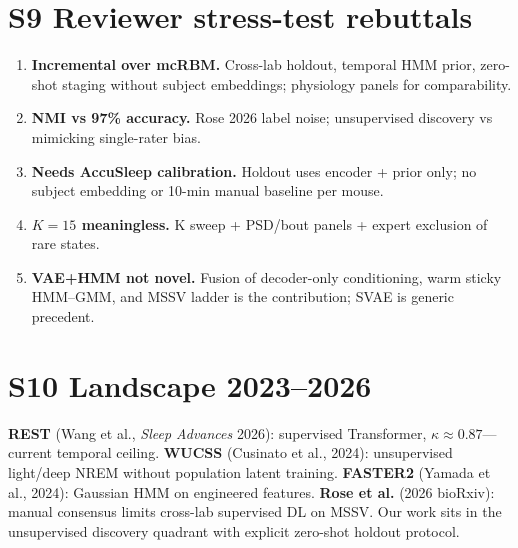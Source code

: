 \documentclass[10pt]{article}
\begin{document}
\section{S9 Reviewer stress-test rebuttals}
\begin{enumerate}
\item \textbf{Incremental over mcRBM.} Cross-lab holdout, temporal HMM prior, zero-shot staging without subject embeddings; physiology panels for comparability.
\item \textbf{NMI vs 97\% accuracy.} Rose 2026 label noise; unsupervised discovery vs mimicking single-rater bias.
\item \textbf{Needs AccuSleep calibration.} Holdout uses encoder + prior only; no subject embedding or 10-min manual baseline per mouse.
\item \textbf{$K{=}15$ meaningless.} K sweep + PSD/bout panels + expert exclusion of rare states.
\item \textbf{VAE+HMM not novel.} Fusion of decoder-only conditioning, warm sticky HMM--GMM, and MSSV ladder is the contribution; SVAE is generic precedent.
\end{enumerate}

\section{S10 Landscape 2023--2026}
\textbf{REST} (Wang et al., \emph{Sleep Advances} 2026): supervised Transformer, $\kappa\approx 0.87$---current temporal ceiling.
\textbf{WUCSS} (Cusinato et al., 2024): unsupervised light/deep NREM without population latent training.
\textbf{FASTER2} (Yamada et al., 2024): Gaussian HMM on engineered features.
\textbf{Rose et al.} (2026 bioRxiv): manual consensus limits cross-lab supervised DL on MSSV.
Our work sits in the unsupervised discovery quadrant with explicit zero-shot holdout protocol.
\end{document}
